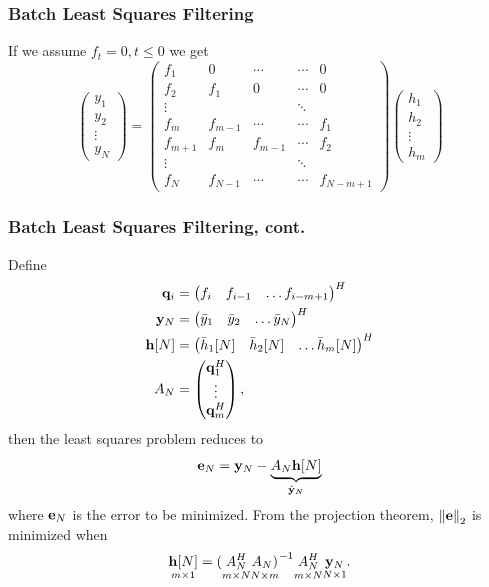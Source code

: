\documentclass{beamer}
\begin{document}
\begin{frame}\frametitle{Batch Least Squares Filtering}
	If we assume $f_t = 0, t \leq 0$ we get
	{\footnotesize
	\[
		\begin{pmatrix}
	 		y_1\\
 	   		y_2\\
 	   		\vdots\\
 	   		y_N
 	   	\end{pmatrix}
 	   	=
 	   	\begin{pmatrix}
   	  		f_1 & 0 & \cdots & \cdots & 0\\
  	  		f_2 & f_1 & 0 & \cdots & 0\\
    		\vdots & & & \ddots\\
    		f_m & f_{m-1} & \cdots & \cdots & f_1 \\
    		f_{m+1} & f_m & f_{m-1} & \cdots & f_2 \\
    		\vdots & & & \ddots \\
    		f_N & f_{N-1} & \cdots & \cdots & f_{N-m+1}
    	\end{pmatrix}
    	\begin{pmatrix}
    		h_1 \\
    		h_2 \\
    		\vdots\\
    		h_m
    	\end{pmatrix}
	\]
	}
\end{frame}

\begin{frame}\frametitle{Batch Least Squares Filtering, cont.}
	Define
	\begin{align*}
		\mathbf{q}_i &= \begin{pmatrix} f_i & f_{i-1} & \dots f_{i-m+1} \end{pmatrix}^H \\
		\mathbf{y}_N &= \begin{pmatrix} \bar{y}_1 & \bar{y}_2 & \dots \bar{y}_N \end{pmatrix}^H \\
		\mathbf{h}[N] &= \begin{pmatrix} \bar{h}_1[N] & \bar{h}_2[N] & \dots \bar{h}_m[N] \end{pmatrix}^H \\
		A_N &= \begin{pmatrix} \mathbf{q}^H_1 \\ \vdots \\ \mathbf{q}^H_m \end{pmatrix},
	\end{align*}
	then the least squares problem reduces to
	\[ 
		\mathbf{e}_N = \mathbf{y}_N - \underbrace{A_N \mathbf{h}[N]}_{\hat{\mathbf{y}}_N}
	\] 
	where $\mathbf{e}_N$ is the error to be minimized.  From the projection theorem, $\left\|\mathbf{e}\right\|_2$ is minimized when
	\[
		\underset{m\times 1}{\mathbf{h}[N]} = (\underset{m \times N}{A^H_N} \underset{N \times m}{A_N)}^{-1}\underset{m\times N}{A^H_N}\underset{N\times 1}{\mathbf{y}_N}. 
	\]
\end{frame}
\end{document}
